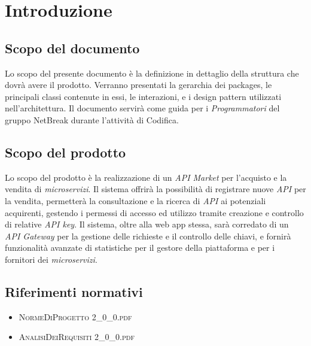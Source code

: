 \newpage
\section{Introduzione}

\subsection{Scopo del documento}
Lo scopo del presente documento è la definizione in dettaglio della struttura che dovrà avere il prodotto. Verranno presentati la gerarchia dei packages, le principali classi contenute in essi, le interazioni, e i design pattern utilizzati nell'architettura.  Il documento servirà come guida per i \textit{Programmatori} del gruppo NetBreak durante l'attività di Codifica.

\subsection{Scopo del prodotto}
Lo scopo del prodotto è la realizzazione di un \textit{API Market} per l'acquisto e la vendita di \textit{microservizi}. Il sistema offrirà la possibilità di registrare nuove \textit{API} per la vendita, permetterà la consultazione e la ricerca di \textit{API} ai potenziali acquirenti, gestendo i permessi di accesso ed utilizzo tramite creazione e controllo di relative \textit{API key}. Il sistema, oltre alla web app stessa, sarà corredato di un \textit{API Gateway} per la gestione delle richieste e il controllo delle chiavi, e fornirà funzionalità avanzate di statistiche per il gestore della piattaforma e per i fornitori dei \textit{microservizi}.

\subsection{Riferimenti normativi}
\begin{itemize}
	\item \textsc{NormeDiProgetto 2\_0\_0.pdf}
	\item \textsc{AnalisiDeiRequisiti 2\_0\_0.pdf}
\end{itemize}

